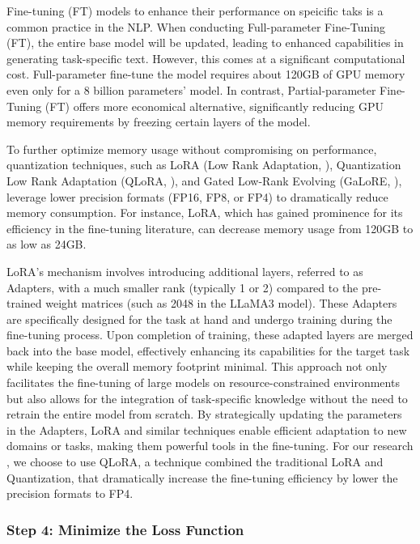 Fine-tuning (FT) models to enhance their performance on speicific taks is a common practice in the NLP. When conducting Full-parameter Fine-Tuning (FT), the entire base model will be updated, leading to enhanced capabilities in generating task-specific text. However, this comes at a significant computational cost.  Full-parameter fine-tune the model requires about 120GB of GPU memory even only for a 8 billion parameters' model. In contrast, Partial-parameter Fine-Tuning (FT) offers more economical alternative, significantly reducing GPU memory requirements by freezing certain layers of the model.


To further optimize memory usage without compromising on performance, quantization techniques, such as LoRA (Low Rank Adaptation, \cite{hu2021lora}), Quantization Low Rank Adaptation (QLoRA, \cite{dettmers2024qlora}), and Gated Low-Rank Evolving (GaLoRE, \cite{zhao2024galore}), leverage lower precision formats (FP16, FP8, or FP4) to dramatically reduce memory consumption. For instance, LoRA, which has gained prominence for its efficiency in the fine-tuning literature, can decrease memory usage from 120GB to as low as 24GB.

LoRA's mechanism involves introducing additional layers, referred to as Adapters, with a much smaller rank (typically 1 or 2) compared to the pre-trained weight matrices (such as 2048 in the LLaMA3 model). These Adapters are specifically designed for the task at hand and undergo training during the fine-tuning process. Upon completion of training, these adapted layers are merged back into the base model, effectively enhancing its capabilities for the target task while keeping the overall memory footprint minimal. This approach not only facilitates the fine-tuning of large models on resource-constrained environments but also allows for the integration of task-specific knowledge without the need to retrain the entire model from scratch. By strategically updating the parameters in the Adapters, LoRA and similar techniques enable efficient adaptation to new domains or tasks, making them powerful tools in the fine-tuning. For our research , we choose to use QLoRA, a technique combined the traditional LoRA and Quantization, that dramatically increase the fine-tuning efficiency by lower the precision formats to FP4. 



\subsubsection*{Step 4: Minimize the Loss Function}


